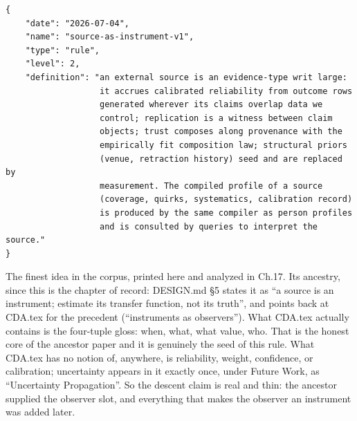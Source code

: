 \begin{lstlisting}[language={},basicstyle=\ttfamily\footnotesize]
{
    "date": "2026-07-04",
    "name": "source-as-instrument-v1",
    "type": "rule",
    "level": 2,
    "definition": "an external source is an evidence-type writ large:
                   it accrues calibrated reliability from outcome rows
                   generated wherever its claims overlap data we
                   control; replication is a witness between claim
                   objects; trust composes along provenance with the
                   empirically fit composition law; structural priors
                   (venue, retraction history) seed and are replaced by
                   measurement. The compiled profile of a source
                   (coverage, quirks, systematics, calibration record)
                   is produced by the same compiler as person profiles
                   and is consulted by queries to interpret the source."
}
\end{lstlisting}

The finest idea in the corpus, printed here and analyzed in Ch.17. Its ancestry, since this is the chapter of record: DESIGN.md \S5 states it as ``a source is an instrument; estimate its transfer function, not its truth'', and points back at CDA.tex for the precedent (``instruments as observers''). What CDA.tex actually contains is the four-tuple gloss: when, what, what value, who. That is the honest core of the ancestor paper and it is genuinely the seed of this rule. What CDA.tex has no notion of, anywhere, is reliability, weight, confidence, or calibration; uncertainty appears in it exactly once, under Future Work, as ``Uncertainty Propagation''. So the descent claim is real and thin: the ancestor supplied the observer slot, and everything that makes the observer an instrument was added later.

